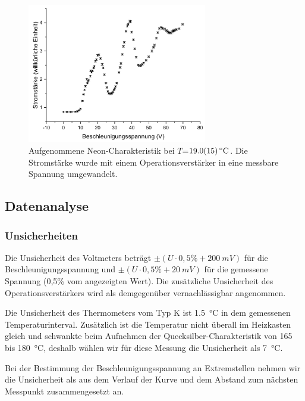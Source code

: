 \documentclass[
	a4paper,
	12pt,
	pagesize,
	ngerman
]{scrartcl}
\begin{document}
	\begin{figure}[H]
		\includegraphics[width=0.7\textwidth]{Ne19}
		\centering
		\caption{Aufgenommene Neon-Charakteristik bei $T$=$\SI{19,0 +- 1,5}{\degreeCelsius}$. Die Stromstärke wurde mit einem Operationsverstärker in eine messbare Spannung umgewandelt.}
		\label{Ne19}
		\centering
	\end{figure}
	
	\subsection{Datenanalyse}
	\subsubsection{Unsicherheiten}
	Die Unsicherheit des  Voltmeters beträgt $\pm (U \cdot 0,5\% + \SI{200}{mV})$ für die Beschleunigungsspannung und $\pm (U \cdot 0,5\% + \SI{20}{mV})$ für die gemessene Spannung (0,5\% vom angezeigten Wert).\cite{FH-Pforzheim} Die zusätzliche Unsicherheit des Operationsverstärkers wird als demgegenüber vernachlässigbar angenommen. 
	
	Die Unsicherheit des Thermometers vom Typ K ist \SI{1,5}{\degreeCelsius} in dem gemessenen Temperaturinterval.\cite{DIN} 
	Zusätzlich ist die Temperatur nicht überall im Heizkasten gleich und schwankte beim Aufnehmen der Quecksilber-Charakteristik von 165 bis \SI{180}{\degreeCelsius}, deshalb wählen wir für diese Messung die Unsicherheit als \SI{7}{\degreeCelsius}.
	
	Bei der Bestimmung der Beschleunigungsspannung an Extremstellen nehmen wir die Unsicherheit als aus dem Verlauf der Kurve und dem Abstand zum nächsten Messpunkt zusammengesetzt an.
	
\end{document}
